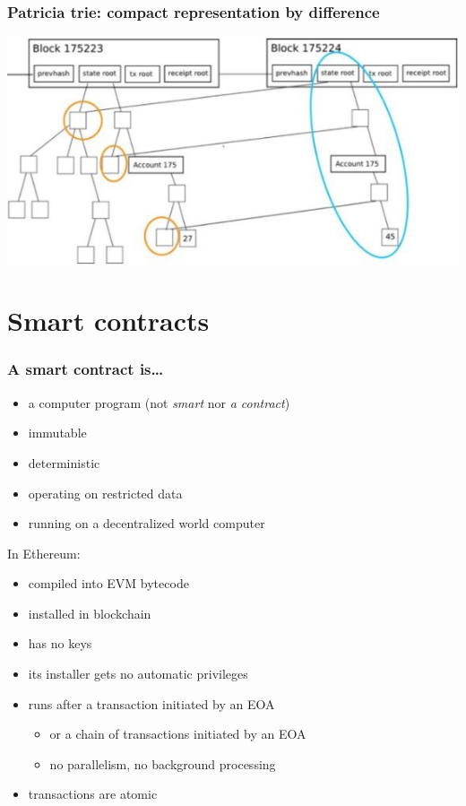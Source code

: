\documentclass[11pt]{beamer}  %
\begin{document}
\begin{frame}\frametitle{Patricia trie: compact representation by difference}

  \begin{center}
    \includegraphics[scale=0.55,clip=false]{pictures/trie-update.jpg}
  \end{center}

\end{frame}

\section{Smart contracts}

\begin{frame}\frametitle{A smart contract is\ldots}

  \begin{itemize}
  \item a computer program (not \emph{smart} nor \emph{a contract})
  \item immutable
  \item deterministic
  \item operating on restricted data
  \item running on a decentralized world computer
  \end{itemize}

  In Ethereum:
  \begin{itemize}
  \item compiled into EVM bytecode
  \item installed in blockchain
  \item has no keys
  \item its installer gets no automatic privileges
  \item runs after a transaction initiated by an EOA
    \begin{itemize}
    \item or a chain of transactions initiated by an EOA
    \item no parallelism, no background processing
    \end{itemize}
  \item transactions are atomic
  \end{itemize}
  
\end{frame}
\end{document}
